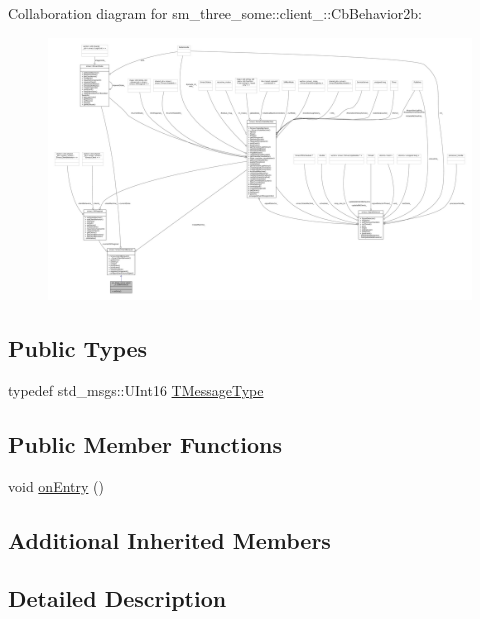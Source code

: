 Collaboration diagram for sm\+\_\+three\+\_\+some\+:\+:client\+\_\+:\+:Cb\+Behavior2b\+:
\nopagebreak
\begin{figure}[H]
\begin{center}
\leavevmode
\includegraphics[width=350pt]{classsm__three__some_1_1client__2_1_1CbBehavior2b__coll__graph}
\end{center}
\end{figure}
\subsection*{Public Types}
\begin{DoxyCompactItemize}
\item 
typedef std\+\_\+msgs\+::\+U\+Int16 \hyperlink{classsm__three__some_1_1client__2_1_1CbBehavior2b_ae023a02167e342dd18679670ac5a6ec4}{T\+Message\+Type}
\end{DoxyCompactItemize}
\subsection*{Public Member Functions}
\begin{DoxyCompactItemize}
\item 
void \hyperlink{classsm__three__some_1_1client__2_1_1CbBehavior2b_a76eec2057cadcb5010c0cb758e6a0c17}{on\+Entry} ()
\end{DoxyCompactItemize}
\subsection*{Additional Inherited Members}


\subsection{Detailed Description}


